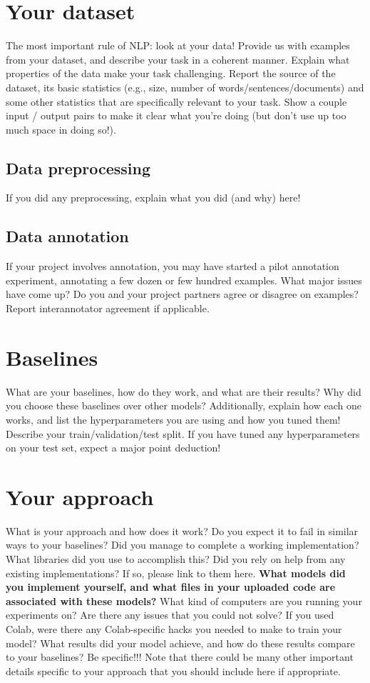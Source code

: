 \documentclass[11pt,a4paper]{article}
\begin{document}
\section{Your dataset}
The most important rule of NLP: look at your data! Provide us with examples from your dataset, and describe your task in a coherent manner. Explain what properties of the data make your task challenging. Report the source of the dataset, its basic statistics (e.g., size, number of words/sentences/documents) and some other statistics that are specifically relevant to your task. Show a couple input / output pairs to make it clear what you're doing (but don't use up too much space in doing so!).

\subsection{Data preprocessing}
If you did any preprocessing, explain what you did (and why) here! 

\subsection{Data annotation}
If your project involves annotation, you may have started a pilot annotation experiment, annotating a few dozen or few hundred examples. What major issues have come up? Do you and your project partners agree or disagree on examples? Report interannotator agreement if applicable.

\section{Baselines}
What are your baselines, how do they work, and what are their results? Why did you choose these baselines over other models? Additionally, explain how each one works, and list the hyperparameters you are using and how you tuned them! Describe your train/validation/test split. If you have tuned any hyperparameters on your test set, expect a major point deduction! 

\section{Your approach}
What is your approach and how does it work? Do you expect it to fail in similar ways to your baselines? Did you manage to complete a working implementation? What libraries did you use to accomplish this? Did you rely on help from any existing implementations? If so, please link to them here. \textbf{What models did you implement yourself, and what files in your uploaded code are associated with these models?} What kind of computers are you running your experiments on? Are there any issues that you could not solve? If you used Colab, were there any Colab-specific hacks you needed to make to train your model? What results did your model achieve, and how do these results compare to your baselines? Be specific!!! Note that there could be many other important details specific to your approach that you should include here if appropriate.
\end{document}
